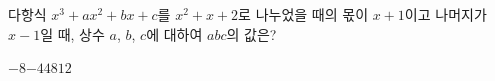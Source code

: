 다항식 $x^3+ax^2+bx+c$를 $x^2+x+2$로 나누었을 때의 몫이 $x+1$이고 나머지가 $x-1$일 때, 상수 $a$, $b$, $c$에 대하여 $abc$의 값은?
\begin{choices32}{$-8$}{$-4$}{$4$}{$8$}{$12$}\end{choices32}

